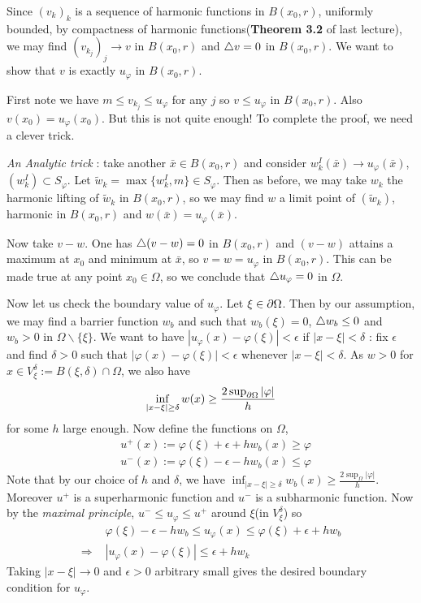\documentclass[12pt,a4paper]{article}
\newenvironment{proof}
{\begin{changemargin}{1cm}{0.5cm} 
	}%
	{\end{changemargin}
}
\begin{document}
\begin{proof}
Since $(v_k)_k$ is a sequence of harmonic functions in $B(x_0,r)$, uniformly bounded, by compactness of harmonic functions(\textbf{Theorem 3.2} of last lecture), we may find $(v_{k_j})_{j} \rightarrow v$ in $B(x_0, r)$ and $\triangle v =0$ in $B(x_0, r)$. We want to show that $v$ is exactly $u_{\varphi}$ in $B(x_0, r)$.

\quad First note we have $m\leq v_{k_j} \leq u_{\varphi}$ for any $j$ so $v\leq u_{\varphi}$ in $B(x_0, r)$. Also $v(x_0) = u_{\varphi}(x_0)$. But this is not quite enough! To complete the proof, we need a clever trick.
\s

\emph{An Analytic trick} : take another $\bar{x} \in B(x_0,r)$ and consider $w_k^I(\bar{x}) \rightarrow u_{\varphi}(\bar{x})$, $(w^I_k) \subset S_{\varphi}$. Let $\tilde{w}_k = \max \{w^I_k,m\} \in S_{\varphi}$. Then as before, we may take $w_k$ the harmonic lifting of $\tilde{w}_k$ in $B(x_0,r)$, so we may find $w$ a limit point of $(\tilde{w}_k)$, harmonic in $B(x_0, r)$ and $w(\bar{x}) = u_{\varphi}(\bar{x})$.
\s

Now take $v-w$. One has $\triangle (v-w) =0$ in $B(x_0, r)$ and $(v-w)$ attains a maximum at $x_0$ and minimum at $\bar{x}$, so $v=w= u_{\varphi}$ in $B(x_0 ,r)$. This can be made true at any point $x_0 \in \Omega$, so we conclude that $\triangle u_{\varphi}=0$ in $\Omega$.
\s

Now let us check the boundary value of $u_{\varphi}$. Let $\xi \in \partial \Omega$. Then by our assumption, we may find a barrier function $w_{b}$ and such that $w_b (\xi)=0$, $\triangle w_b\leq0$ and $w_{b} >0$ in $\Omega \backslash\{\xi\}$. We want to have $|u_{\varphi}(x)- \varphi(\xi)|< \epsilon$ if $|x-\xi|< \delta$ : fix $\epsilon$ and find $\delta >0$ such that $|\varphi(x) - \varphi(\xi)| < \epsilon$ whenever $|x-\xi|< \delta$. As $w>0$ for $x\in V_{\xi}^{\delta} := B(\xi, \delta) \cap \Omega$, we also have
\begin{align*}
\inf_{|x-\xi|\geq \delta} w(x) \geq \frac{2\sup_{\partial \Omega} |\varphi|}{h}
\end{align*}
for some $h$ large enough. Now define the functions on $\Omega$,
\begin{align*}
&u^+(x) := \varphi(\xi) + \epsilon + hw_b(x) \geq \varphi\\
&u^-(x) := \varphi(\xi) - \epsilon - hw_b(x) \leq \varphi
\end{align*}
Note that by our choice of $h$ and $\delta$, we have $\inf_{|x-\xi| \geq \delta} w_b(x) \geq \frac{2\sup_{\Omega} |\varphi|}{h}$. Moreover $u^+$ is a superharmonic function and $u^-$ is a subharmonic function. Now by the \emph{maximal principle}, $u^- \leq u_{\varphi} \leq u^+$ around $\xi$(in $V_{\xi}^{\delta}$) so
\begin{align*}
& \varphi(\xi) - \epsilon - hw_b \leq u_{\varphi}(x) \leq \varphi(\xi) + \epsilon + hw_b \\
\Rightarrow \,\, & |u_{\varphi}(x) - \varphi(\xi)| \leq \epsilon + hw_k
\end{align*}
Taking $|x-\xi| \rightarrow 0$ and $\epsilon>0$ arbitrary small gives the desired boundary condition for $u_{\varphi}$.

\eop
\end{proof}
\end{document}
